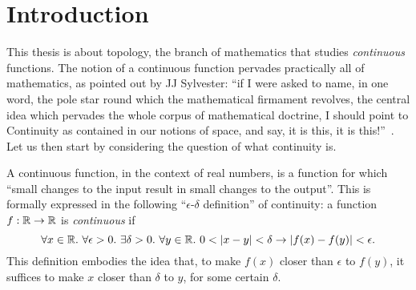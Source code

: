 \chapter{Introduction}

This thesis is about topology, the branch of mathematics that studies \emph{continuous}
functions. The notion of a continuous function pervades practically all of mathematics, as
pointed out by JJ Sylvester: ``if I were asked to name, in one word, the pole star round
which the mathematical firmament revolves, the central idea which pervades the whole
corpus of mathematical doctrine, I should point to Continuity as contained in our notions
of space, and say, it is this, it is this!''~\cite[pg. 27]{armstrong-topology}. Let us
then start by considering the question of what continuity is.

A continuous function, in the context of real numbers, is a function for which
``small changes to the input result in small changes to the output''. This is
formally expressed in the following ``$\epsilon$-$\delta$ definition'' of continuity: a
function $f : \mathbb{R}{} \rightarrow \mathbb{R}{}$ is
\emph{continuous} if
\begin{equation*}\label{eq:cont-0}
  \forall x \in \mathbb{R}{}.~ \forall \epsilon > 0.~ \exists \delta > 0.~ \forall y \in \mathbb{R}{}.~
    0 < | x - y | < \delta \rightarrow | f(x) - f(y) | < \epsilon.
\end{equation*}
This definition embodies the idea that, to make $f(x)$ closer than $\epsilon$ to
$f(y)$, it suffices to make $x$ closer than $\delta$ to $y$, for some certain $\delta$.

